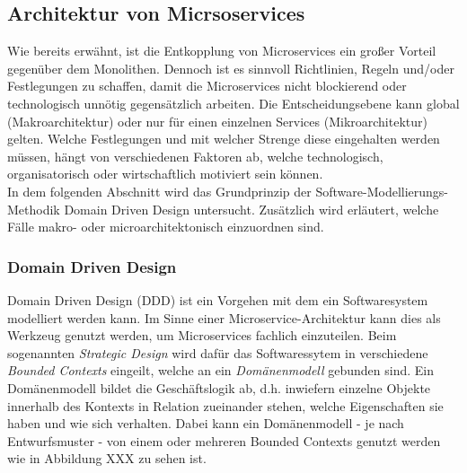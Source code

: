 \subsection{Architektur von Micrsoservices}


Wie bereits erwähnt, ist die Entkopplung von Microservices ein großer Vorteil gegenüber dem Monolithen. Dennoch ist es sinnvoll Richtlinien, Regeln und/oder Festlegungen zu schaffen, damit die Microservices nicht blockierend oder technologisch unnötig gegensätzlich arbeiten. Die Entscheidungsebene kann global (Makroarchitektur) oder nur für einen einzelnen Services (Mikroarchitektur) gelten.\cite{wolff2016mic_architectures} Welche Festlegungen und mit welcher Strenge diese eingehalten werden müssen, hängt von verschiedenen Faktoren ab, welche technologisch, organisatorisch oder wirtschaftlich motiviert sein können.\cite{rewe2019mic_ppp} \\ 

In dem folgenden Abschnitt wird das Grundprinzip der Software-Modellierungs-Methodik Domain Driven Design untersucht. Zusätzlich wird erläutert, welche Fälle makro- oder microarchitektonisch einzuordnen sind. \\

\subsubsection{Domain Driven Design}

Domain Driven Design (DDD) ist ein Vorgehen mit dem ein Softwaresystem modelliert werden kann. Im Sinne einer Microservice-Architektur kann dies als Werkzeug genutzt werden, um Microservices fachlich einzuteilen.\cite{heise2016ddd} Beim sogenannten \textit{Strategic Design} wird dafür das Softwaressytem in verschiedene \textit{Bounded Contexts} eingeilt, welche an ein \textit{Domänenmodell} gebunden sind. Ein Domänenmodell bildet die Geschäftslogik ab, d.h. inwiefern einzelne Objekte innerhalb des Kontexts in Relation zueinander stehen, welche Eigenschaften sie haben und wie sich verhalten. Dabei kann ein Domänenmodell - je nach Entwurfsmuster - von einem oder mehreren Bounded Contexts genutzt werden wie in Abbildung XXX zu sehen ist.\cite{wolff2018mic_praxis}  \\


